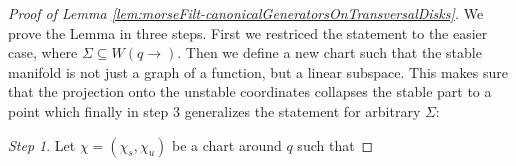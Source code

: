 \begin{proof}[Proof of Lemma \ref{lem:morseFilt-canonicalGeneratorsOnTransversalDisks}]
	We prove the Lemma in three steps. First we restriced the statement to the easier case, where $\Sigma\subseteq W(q\to)$. Then we define a new chart such that the stable manifold is not just a graph of a function, but a linear subspace. This makes sure that the projection onto the unstable coordinates collapses the stable part to a point which finally in step 3 generalizes the statement for arbitrary $\Sigma$:

	\textit{Step 1}. Let $\chi=(\chi_s,\chi_u)$ be a chart around $q$ such that 
	

\end{proof}
